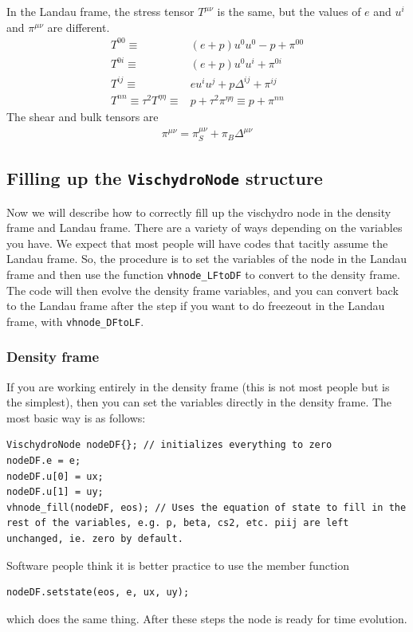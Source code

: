 \documentclass[12pt]{article}
\begin{document}
In the Landau frame, the stress tensor $T^{\mu\nu}$ is the same, but the values of $e$ and $u^i$ and $\pi^{\mu\nu}$ are different. 
\begin{align}
T^{00} \equiv & ( e + p) u^0 u^0 - p + \pi^{00} \\
T^{0i} \equiv  & ( e + p) u^0 u^i + \pi^{0i} \\
T^{ij} \equiv&  e u^i u^j + p \Delta^{ij} + \pi^{ij} \\
T^{nn} \equiv \tau^2 T^{\eta\eta} \equiv & p + \tau^2 \pi^{\eta\eta} \equiv p + \pi^{nn} 
\end{align}
The shear and bulk tensors are 
\begin{align}
\pi^{\mu\nu} = \pi^{\mu\nu}_S + \pi_B \Delta^{\mu\nu} 
\end{align}


\subsection{Filling up the {\tt VischydroNode} structure}
Now we will describe how to correctly fill up the vischydro node in the density frame and Landau frame.  There are a variety of ways depending on the variables you have.  We expect that most people will have codes that tacitly assume the Landau frame. So, the procedure is to set the variables of the node in the Landau frame and then use the function \texttt{vhnode_LFtoDF} to convert to the density frame.  The code will then evolve the density frame variables, and you can convert back to the Landau frame after the step if you want to do freezeout in the Landau frame, with \texttt{vhnode_DFtoLF}.

\subsubsection{Density frame}
If you are working entirely in the density frame (this is not most people but is the simplest), then you can set the variables directly in the density frame.  The most basic way  is as follows:
\begin{verbatim}
VischydroNode nodeDF{}; // initializes everything to zero
nodeDF.e = e;
nodeDF.u[0] = ux;
nodeDF.u[1] = uy;
vhnode_fill(nodeDF, eos); // Uses the equation of state to fill in the rest of the variables, e.g. p, beta, cs2, etc. piij are left unchanged, ie. zero by default.
\end{verbatim}
Software people think it is  better practice to use the member function
\begin{verbatim}
nodeDF.setstate(eos, e, ux, uy);
\end{verbatim}
which does the same thing.  After these steps the node is ready for time evolution.
\end{document}

